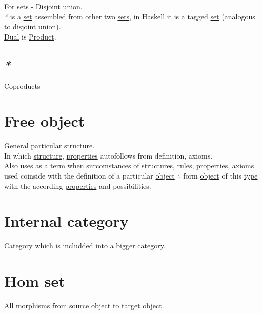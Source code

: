 \documentclass[a4paper,14pt,oneside]{book}
\begin{document}
For \hyperref[org1faae0f]{sets} - Disjoint union.\\

\emph{*} is a \hyperref[orge119629]{set} assembled from other two \hyperref[org1faae0f]{sets}, in Haskell it is a tagged \hyperref[orge119629]{set} (analogous to disjoint union).\\

\hyperref[orgccd1357]{Dual} is \hyperref[org7331b6a]{Product}.\\

\subsection{\emph{*}}
\label{sec:orgff4c8f1}

\label{org0a4cac0}Coproducts\\

\section{\label{org8b61aca}Free object}
\label{sec:orgb38d1c5}
General particular \hyperref[orgc940043]{structure}.\\
In which \hyperref[orgc940043]{structure}, \hyperref[org1feb373]{properties} autofollows from definition, axioms.\\

Also uses as a term when surcomstances of \hyperref[org5ea44de]{structures}, rules, \hyperref[org1feb373]{properties}, axioms used coinside with the definition of a particular \hyperref[org5771609]{object} \(\therefore\) form \hyperref[org5771609]{object} of this \hyperref[orgd6db20c]{type} with the according \hyperref[org1feb373]{properties} and possibilities.\\

\section{\label{org89f69f8}Internal category}
\label{sec:org83d389f}
\hyperref[org841d8bc]{Category} which is includded into a bigger \hyperref[org841d8bc]{category}.\\

\section{\label{org379dfc8}Hom set}
\label{sec:org8153ebb}
All \hyperref[org9d6b2ec]{morphisms} from source \hyperref[org5771609]{object} to target \hyperref[org5771609]{object}.\\
\end{document}

